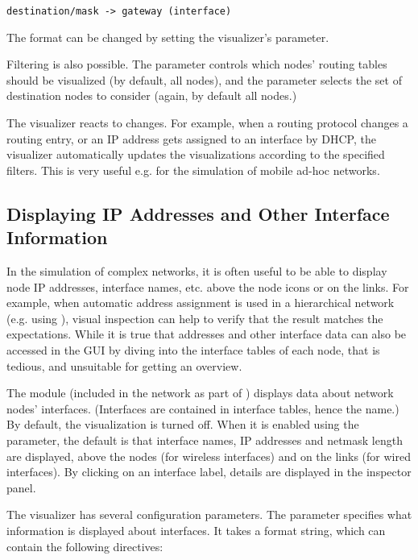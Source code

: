 \begin{verbatim}
destination/mask -> gateway (interface)
\end{verbatim}

The format can be changed by setting the visualizer's  parameter.

Filtering is also possible. The  parameter controls which nodes'
routing tables should be visualized (by default, all nodes), and the
 parameter selects the set of destination nodes to consider
(again, by default all nodes.)

The visualizer reacts to changes. For example, when a routing protocol changes a
routing entry, or an IP address gets assigned to an interface by DHCP, the
visualizer automatically updates the visualizations according to the specified
filters. This is very useful e.g. for the simulation of mobile ad-hoc networks.

\subsection{Displaying IP Addresses and Other Interface Information}
\label{sec:visualization:displaying-ip-addresses-and-other-interface-information}

In the simulation of complex networks, it is often useful to be able to display
node IP addresses, interface names, etc. above the node icons or on the links.
For example, when automatic address assignment is used in a hierarchical network
(e.g. using ), visual inspection can help to
verify that the result matches the expectations. While it is true that addresses and other
interface data can also be accessed in the GUI by diving into the interface
tables of each node, that is tedious, and unsuitable for getting an overview.

The  module (included in the network as part of
) displays data about network nodes' interfaces.
(Interfaces are contained in interface tables, hence the name.) By default, the
visualization is turned off. When it is enabled using the
 parameter, the default is that interface names, IP
addresses and netmask length are displayed, above the nodes (for wireless
interfaces) and on the links (for wired interfaces). By clicking on an interface
label, details are displayed in the inspector panel.

The visualizer has several configuration parameters. The  parameter
specifies what information is displayed about interfaces. It takes a format
string, which can contain the following directives:

